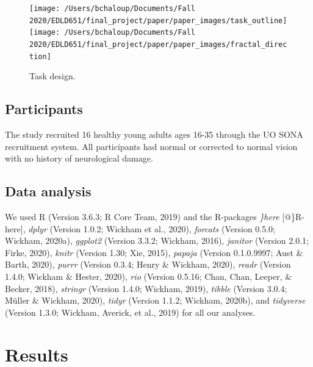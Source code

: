 \documentclass[english,jou]{apa6}
\begin{document}
\begin{figure}

{\centering \texttt{[image: /Users/bchaloup/Documents/Fall 2020/EDLD651/final\_project/paper/paper\_images/task\_outline]} \texttt{[image: /Users/bchaloup/Documents/Fall 2020/EDLD651/final\_project/paper/paper\_images/fractal\_direction]} 

}

\caption{Task design.}\label{fig:task}
\end{figure}

\hypertarget{participants}{%
\subsection{Participants}\label{participants}}

The study recruited 16 healthy young adults ages 16-35 through the UO SONA recruitment system. All participants had normal or corrected to normal vision with no history of neurological damage.

\hypertarget{data-analysis}{%
\subsection{Data analysis}\label{data-analysis}}

We used R (Version 3.6.3; R Core Team, 2019) and the R-packages \emph{\}here} {[}@\}R-here{]}, \emph{dplyr} (Version 1.0.2; Wickham et al., 2020), \emph{forcats} (Version 0.5.0; Wickham, 2020a), \emph{ggplot2} (Version 3.3.2; Wickham, 2016), \emph{janitor} (Version 2.0.1; Firke, 2020), \emph{knitr} (Version 1.30; Xie, 2015), \emph{papaja} (Version 0.1.0.9997; Aust \& Barth, 2020), \emph{purrr} (Version 0.3.4; Henry \& Wickham, 2020), \emph{readr} (Version 1.4.0; Wickham \& Hester, 2020), \emph{rio} (Version 0.5.16; Chan, Chan, Leeper, \& Becker, 2018), \emph{stringr} (Version 1.4.0; Wickham, 2019), \emph{tibble} (Version 3.0.4; Müller \& Wickham, 2020), \emph{tidyr} (Version 1.1.2; Wickham, 2020b), and \emph{tidyverse} (Version 1.3.0; Wickham, Averick, et al., 2019) for all our analyses.

\hypertarget{results}{%
\section{Results}\label{results}}
\end{document}
